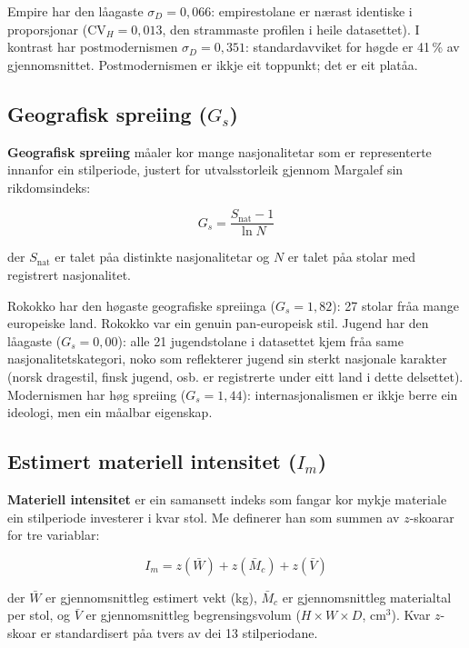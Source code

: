 \documentclass[10pt, a4paper, twocolumn]{article}
\begin{document}
Empire har den l\r{a}agaste $\sigma_D = 0{,}066$: empirestolane er n\ae rast identiske i proporsjonar ($\text{CV}_H = 0{,}013$, den strammaste profilen i heile datasettet). I kontrast har postmodernismen $\sigma_D = 0{,}351$: standardavviket for h\o gde er 41\,\% av gjennomsnittet. Postmodernismen er ikkje eit toppunkt; det er eit plat\r{a}a.


\subsection{Geografisk spreiing ($G_s$)}

\textbf{Geografisk spreiing} m\r{a}aler kor mange nasjonalitetar som er representerte innanfor ein stilperiode, justert for utvalsstorleik gjennom Margalef sin rikdomsindeks:

\begin{equation}
  G_s = \frac{S_{\text{nat}} - 1}{\ln N}
\end{equation}

\noindent der $S_{\text{nat}}$ er talet p\r{a}a distinkte nasjonalitetar og $N$ er talet p\r{a}a stolar med registrert nasjonalitet.

Rokokko har den h\o gaste geografiske spreiinga ($G_s = 1{,}82$): 27 stolar fr\r{a}a mange europeiske land. Rokokko var ein genuin pan-europeisk stil. Jugend har den l\r{a}agaste ($G_s = 0{,}00$): alle 21 jugendstolane i datasettet kjem fr\r{a}a same nasjonalitetskategori, noko som reflekterer jugend sin sterkt nasjonale karakter (norsk dragestil, finsk jugend, osb. er registrerte under eitt land i dette delsettet). Modernismen har h\o g spreiing ($G_s = 1{,}44$): internasjonalismen er ikkje berre ein ideologi, men ein m\r{a}albar eigenskap.


\subsection{Estimert materiell intensitet ($I_m$)}

\textbf{Materiell intensitet} er ein samansett indeks som fangar kor mykje materiale ein stilperiode investerer i kvar stol. Me definerer han som summen av $z$-skoarar for tre variablar:

\begin{equation}
  I_m = z(\bar{W}) + z(\bar{M}_c) + z(\bar{V})
\end{equation}

\noindent der $\bar{W}$ er gjennomsnittleg estimert vekt (kg), $\bar{M}_c$ er gjennomsnittleg materialtal per stol, og $\bar{V}$ er gjennomsnittleg begrensingsvolum ($H \times W \times D$, cm$^3$). Kvar $z$-skoar er standardisert p\r{a}a tvers av dei 13 stilperiodane.
\end{document}
